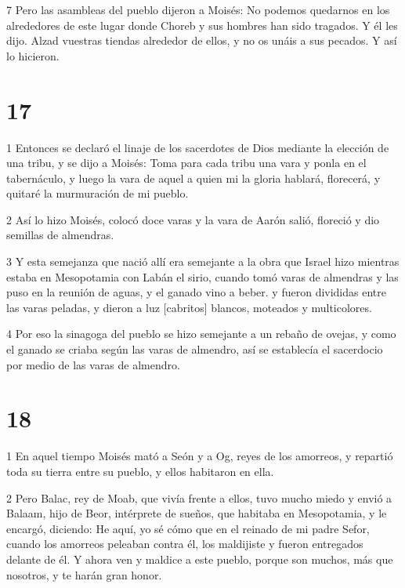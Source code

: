 \par 7 Pero las asambleas del pueblo dijeron a Moisés: No podemos quedarnos en los alrededores de este lugar donde Choreb y sus hombres han sido tragados. Y él les dijo. Alzad vuestras tiendas alrededor de ellos, y no os unáis a sus pecados. Y así lo hicieron.

\chapter{17}

\par 1 Entonces se declaró el linaje de los sacerdotes de Dios mediante la elección de una tribu, y se dijo a Moisés: Toma para cada tribu una vara y ponla en el tabernáculo, y luego la vara de aquel a quien mi la gloria hablará, florecerá, y quitaré la murmuración de mi pueblo.

\par 2 Así lo hizo Moisés, colocó doce varas y la vara de Aarón salió, floreció y dio semillas de almendras.

\par 3 Y esta semejanza que nació allí era semejante a la obra que Israel hizo mientras estaba en Mesopotamia con Labán el sirio, cuando tomó varas de almendras y las puso en la reunión de aguas, y el ganado vino a beber. y fueron divididas entre las varas peladas, y dieron a luz [cabritos] blancos, moteados y multicolores.

\par 4 Por eso la sinagoga del pueblo se hizo semejante a un rebaño de ovejas, y como el ganado se criaba según las varas de almendro, así se establecía el sacerdocio por medio de las varas de almendro.

\chapter{18}

\par 1 En aquel tiempo Moisés mató a Seón y a Og, reyes de los amorreos, y repartió toda su tierra entre su pueblo, y ellos habitaron en ella.

\par 2 Pero Balac, rey de Moab, que vivía frente a ellos, tuvo mucho miedo y envió a Balaam, hijo de Beor, intérprete de sueños, que habitaba en Mesopotamia, y le encargó, diciendo: He aquí, yo sé cómo que en el reinado de mi padre Sefor, cuando los amorreos peleaban contra él, los maldijiste y fueron entregados delante de él. Y ahora ven y maldice a este pueblo, porque son muchos, más que nosotros, y te harán gran honor.

